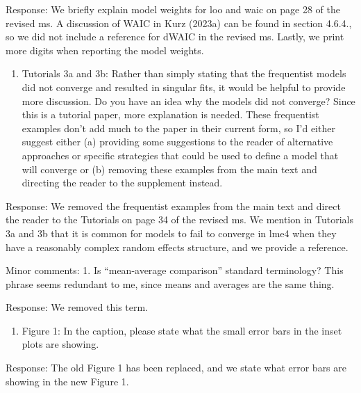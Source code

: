 \documentclass[
]{article}
\providecommand{\tightlist}{%
  \setlength{\itemsep}{0pt}\setlength{\parskip}{0pt}}
\renewenvironment{quote}{\begin{leftbar}}{\end{leftbar}}
\begin{document}
Response: We briefly explain model weights for loo and waic on page 28
of the revised ms. A discussion of WAIC in Kurz (2023a) can be found in
section 4.6.4., so we did not include a reference for dWAIC in the
revised ms. Lastly, we print more digits when reporting the model
weights.

\begin{quote}
\begin{enumerate}
\def\labelenumi{\arabic{enumi}.}
\setcounter{enumi}{6}
\tightlist
\item
  Tutorials 3a and 3b: Rather than simply stating that the frequentist
  models did not converge and resulted in singular fits, it would be
  helpful to provide more discussion. Do you have an idea why the models
  did not converge? Since this is a tutorial paper, more explanation is
  needed. These frequentist examples don't add much to the paper in
  their current form, so I'd either suggest either (a) providing some
  suggestions to the reader of alternative approaches or specific
  strategies that could be used to define a model that will converge or
  (b) removing these examples from the main text and directing the
  reader to the supplement instead.
\end{enumerate}
\end{quote}

Response: We removed the frequentist examples from the main text and
direct the reader to the Tutorials on page 34 of the revised ms. We
mention in Tutorials 3a and 3b that it is common for models to fail to
converge in lme4 when they have a reasonably complex random effects
structure, and we provide a reference.

\begin{quote}
Minor comments: 1. Is ``mean-average comparison'' standard terminology?
This phrase seems redundant to me, since means and averages are the same
thing.
\end{quote}

Response: We removed this term.

\begin{quote}
\begin{enumerate}
\def\labelenumi{\arabic{enumi}.}
\setcounter{enumi}{1}
\tightlist
\item
  Figure 1: In the caption, please state what the small error bars in
  the inset plots are showing.
\end{enumerate}
\end{quote}

Response: The old Figure 1 has been replaced, and we state what error
bars are showing in the new Figure 1.
\end{document}
